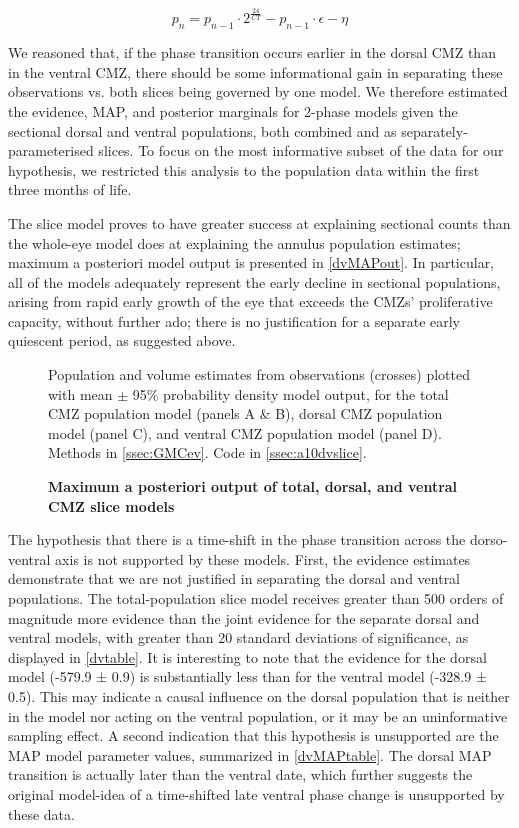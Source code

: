 \begin{equation}
    p_n=p_{n-1} \cdot 2^{\frac{24}{CT}} - p_{n-1} \cdot \epsilon - \eta
    \label{sliceeq}
\end{equation}

We reasoned that, if the phase transition occurs earlier in the dorsal CMZ than in the ventral CMZ, there should be some informational gain in separating these observations vs. both slices being governed by one model. We therefore estimated the evidence, MAP, and posterior marginals for 2-phase models given the sectional dorsal and ventral populations, both combined and as separately-parameterised slices. To focus on the most informative subset of the data for our hypothesis, we restricted this analysis to the population data within the first three months of life.

The slice model proves to have greater success at explaining sectional counts than the whole-eye model does at explaining the annulus population estimates; maximum a posteriori model output is presented in \autoref{dvMAPout}. In particular, all of the models adequately represent the early decline in sectional populations, arising from rapid early growth of the eye that exceeds the CMZs' proliferative capacity, without further ado; there is no justification for a separate early quiescent period, as suggested above.

\begin{figure}[!h]
    \caption{{\bf Maximum a posteriori output of total, dorsal, and ventral CMZ slice models}}
    \label{dvMAPout}
    Population and volume estimates from observations (crosses) plotted with mean $\pm$ 95\% probability density model output, for the total CMZ population model (panels A \& B), dorsal CMZ population model (panel C), and ventral CMZ population model (panel D).
    Methods in \autoref{ssec:GMCev}.
    Code in \autoref{ssec:a10dvslice}. 
\end{figure}

The hypothesis that there is a time-shift in the phase transition across the dorso-ventral axis is not supported by these models. First, the evidence estimates demonstrate that we are not justified in separating the dorsal and ventral populations. The total-population slice model receives greater than 500 orders of magnitude more evidence than the joint evidence for the separate dorsal and ventral models, with greater than 20 standard deviations of significance, as displayed in \autoref{dvtable}. It is interesting to note that the evidence for the dorsal model (-579.9 ± 0.9) is substantially less than for the ventral model (-328.9 ± 0.5). This may indicate a causal influence on the dorsal population that is neither in the model nor acting on the ventral population, or it may be an uninformative sampling effect. A second indication that this hypothesis is unsupported are the MAP model parameter values, summarized in \autoref{dvMAPtable}. The dorsal MAP transition is actually later than the ventral date, which further suggests the original model-idea of a time-shifted late ventral phase change is unsupported by these data.

